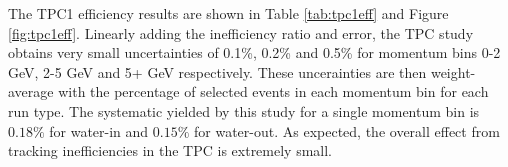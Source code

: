 The TPC1 efficiency results are shown in Table \ref{tab:tpc1eff} and Figure \ref{fig:tpc1eff}. Linearly adding the inefficiency ratio and error, 
the TPC study obtains very small uncertainties of 0.1\%, 0.2\% and 0.5\% 
for momentum bins 0-2 GeV, 2-5 GeV and 5+ GeV respectively. 
These uncerainties are then weight-average with the percentage 
of selected events in each momentum bin for each run type. 
The systematic yielded by this study for a single momentum bin is $0.18 \%$ for water-in and $0.15 \%$ for water-out. 
As expected, the overall effect from tracking inefficiencies 
in the TPC is extremely small.
